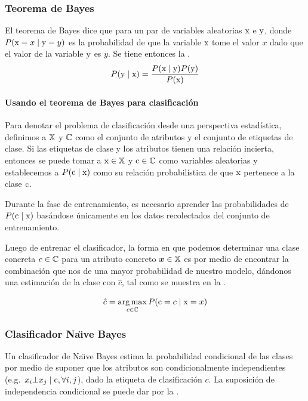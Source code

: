 \subsubsection{Teorema de Bayes} \label{subsec:bayestheo}
El teorema de Bayes dice que para un par de variables aleatorias ${\textnormal{x}}$ e ${\textnormal{y}}$, donde $P({\textnormal{x}}=x \mid {\textnormal{y}}=y)$ es la probabilidad de que la variable ${\textnormal{x}}$ tome el valor $x$ dado que el valor de la variable ${\textnormal{y}}$ es $y$. Se tiene entonces la .
\begin{equation} \label{eq:bayestheo}
  P({\textnormal{y}} \mid {\textnormal{x}}) = \frac{P({\textnormal{x}} \mid {\textnormal{y}}) P({\textnormal{y}})}{P({\textnormal{x}})}
\end{equation}

\paragraph{Usando el teorema de Bayes para clasificación}
Para denotar el problema de clasificación desde una perspectiva estadística, definimos a ${\mathbb{X}}$ y ${\mathbb{C}}$ como el conjunto de atributos y el conjunto de etiquetas de clase. Si las etiquetas de clase y los atributos tienen una relación incierta, entonces se puede tomar a ${\textnormal{x}} \in {\mathbb{X}}$ y ${\textnormal{c}} \in {\mathbb{C}}$ como variables aleatorias y establecemos a $P({\textnormal{c}} \mid {\textnormal{x}})$ como su relación probabilística de que ${\textnormal{x}}$ pertenece a la clase ${\textnormal{c}}$.

Durante la fase de entrenamiento, es necesario aprender las probabilidades de $P({\textnormal{c}} \mid {\textnormal{x}})$ basándose únicamente en los datos recolectados del conjunto de entrenamiento.

Luego de entrenar el clasificador, la forma en que podemos determinar una clase concreta $c \in {\mathbb{C}}$ para un atributo concreto ${\bm{x}} \in {\mathbb{X}}$ es por medio de encontrar la combinación que nos de una mayor probabilidad de nuestro modelo, dándonos una estimación de la clase con $\hat{c}$, tal como se muestra en la .

\begin{equation} \label{eq:bayes-clasification-argmax}
  \hat{c} = \operatorname*{arg\,max}_{c\in{\mathbb{C}}} P({\textnormal{c}} = c \mid {\textnormal{x}} = x)
\end{equation}

\subsubsection{Clasificador Na\"{\i}ve Bayes} \label{subsec:naivebayes}
Un clasificador de Na\"{\i}ve Bayes estima la probabilidad condicional de las clases por medio de suponer que los atributos son condicionalmente independientes \mbox{(e.g. $x_i \bot x_j \mid {\textnormal{c}}, \forall i, j$)}, dado la etiqueta de clasificación $c$. La suposición de independencia condicional se puede dar por la .

